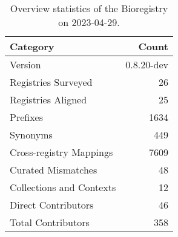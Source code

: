 \begin{table}
\caption{Overview statistics of the Bioregistry on 2023-04-29.}
\label{tab:bioregistry-summary}
\begin{tabular}{lr}
\toprule
Category & Count \\
\midrule
Version & 0.8.20-dev \\
Registries Surveyed & 26 \\
Registries Aligned & 25 \\
Prefixes & 1634 \\
Synonyms & 449 \\
Cross-registry Mappings & 7609 \\
Curated Mismatches & 48 \\
Collections and Contexts & 12 \\
Direct Contributors & 46 \\
Total Contributors & 358 \\
\bottomrule
\end{tabular}
\end{table}
